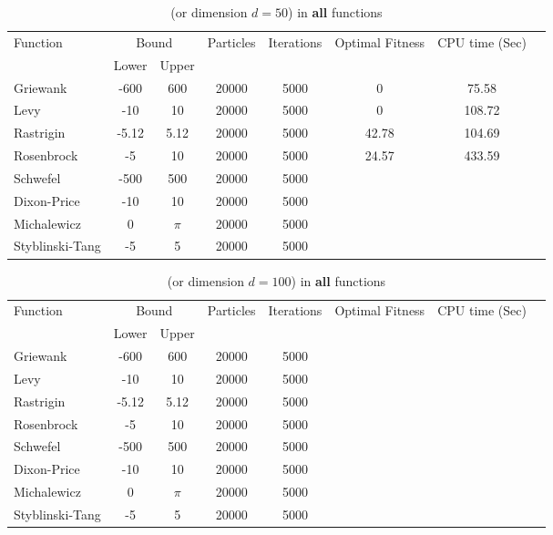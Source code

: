 \documentclass[12pt]{article}
\begin{document}
	
	\begin{table}[H]
		\caption{ (or dimension $d=50$) in \textbf{all} functions}
		\label{table:1}
		\centering
		\begin{tabular}{l c c c c c c c}
			\hline
			Function &  \multicolumn{2}{c}{Bound} & Particles & Iterations &  Optimal Fitness & CPU time (Sec) \\
			& Lower& Upper&&&\\
			\hline
			Griewank  		&  -600   & 600 	&20000 &5000 &0 &75.58 &\\
			Levy 	  		&  -10    & 10 		&20000 &5000 &0 &108.72 &\\
			Rastrigin 		&  -5.12  & 5.12 	&20000 &5000 &42.78 &104.69 &\\
			Rosenbrock		&  -5     & 10 		&20000 &5000 &24.57 &433.59 &\\
			Schwefel 	 	&  -500   & 500 		&20000 &5000 & &\\
			Dixon-Price 	&   -10	  & 10 		&20000 &5000 & &\\
			Michalewicz 	&   0 	  & $\pi$ 	&20000 &5000 & &\\
			Styblinski-Tang & -5 	  & 5  		&20000 &5000 & &\\
			\hline
		\end{tabular}
	\end{table}
	
	\begin{table}[H]
		\caption{ (or dimension $d=100$) in \textbf{all} functions}
		\label{table:1}
		\centering
		\begin{tabular}{l c c c c c c c}
			\hline
			Function &  \multicolumn{2}{c}{Bound} & Particles & Iterations &  Optimal Fitness & CPU time (Sec) \\
			& Lower& Upper&&&\\
			\hline
			Griewank  		&  -600   & 600 		&20000 &5000 & &\\
			Levy 	  		&  -10    & 10 		&20000 &5000 & &\\
			Rastrigin 		&  -5.12  & 5.12 	&20000 &5000 & &\\
			Rosenbrock		&  -5     & 10 		&20000 &5000 & &\\
			Schwefel 	 	&  -500   & 500 		&20000 &5000 & &\\
			Dixon-Price 	&   -10	  & 10 		&20000 &5000 & &\\
			Michalewicz 	&   0 	  & $\pi$ 	&20000 &5000 & &\\
			Styblinski-Tang & -5 	  & 5  		&20000 &5000 & &\\
			\hline
		\end{tabular}
	\end{table}
	
\end{document}
